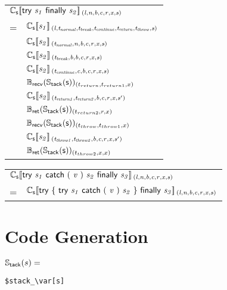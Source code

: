 \documentclass[a4j]{jsarticle}
\newcommand{\lb}{[\![}				%
\newcommand{\rb}{]\!]}				%
\newcommand{\db}[1]{\lb#1\rb}			%
\newcommand{\den}[2]{{#1}\db{#2}\,}
\newcommand{\defC}[3]{\den{#1}{\sf #2}_{\it #3}}
\newcommand{\Cs}{\defC{\mathbb{C}_{\sf s}}}
\newcommand{\Stack}[1]{\mathbb{S}_{\sf tack}(#1)}
\newcommand{\defB}[3]{{#1}({\sf #2})_{#3}}
\newcommand{\Brecv}{\defB{\mathbb{B}_{\sf recv}}}
\newcommand{\Bret}{\defB{\mathbb{B}_{\sf ret}}}
\newcommand{\var}[1]{{\it #1}}
\begin{document}
\vspace{1em}

\begin{tabular}{ll}
\multicolumn{2}{l}{
	$ \Cs{ try\ \var{s_1}\ finally\ \var{s_2} }{(l, n, b, c, r, x, s)} $
}  \\
=  &  $ \Cs{ \var{s_1} }{(l, t_{normal}, t_{break}, t_{continue}, t_{return}, t_{throw}, s)} $ \\

   &  $ \Cs{ \var{s_2} }{(t_{normal}  , n, b, c, r, x, s)} $  \\
   &  $ \Cs{ \var{s_2} }{(t_{break}   , b, b, c, r, x, s)} $  \\
   &  $ \Cs{ \var{s_2} }{(t_{continue}, c, b, c, r, x, s)} $  \\

   &  $ \Brecv{ \Stack{s} }{(t_{return}, t_{return1}, x)}             $  \\
   &  $ \Cs{ \var{s_2} } {(t_{return1}, t_{return2}, b, c, r, x, s')} $  \\
   &  $ \Bret{ \Stack{s} }{(t_{return2}, r, x)}                       $  \\

   &  $ \Brecv{ \Stack{s} }{(t_{throw}, t_{throw1}, x)}           $  \\
   &  $ \Cs{ \var{s_2} }{(t_{throw1}, t_{throw2}, b, c, r, x, s')} $  \\
   &  $ \Bret{ \Stack{s} }{(t_{throw2}, x, x)}                   $
\end{tabular}

\vspace{1em}

\begin{tabular}{ll}
\multicolumn{2}{l}{
	$ \Cs{ try\ \var{s_1}\ catch\ (\ \var{v}\ )\ \var{s_2}\ finally\ \var{s_3} }{(l, n, b, c, r, x, s)} $
}  \\
=  &  $ \Cs{ try\ \{\ try\ \var{s_1}\ catch\ (\ \var{v}\ )\ \var{s_2}\ \}\ finally\ \var{s_3} }{(l, n, b, c, r, x, s)} $ \\
\end{tabular}




\section{Code Generation}

$  \Stack{ s }  =  $
\begin{Verbatim}[frame=single, commandchars=\\\[\]]
$stack_\var[s]
\end{Verbatim}
\end{document}
